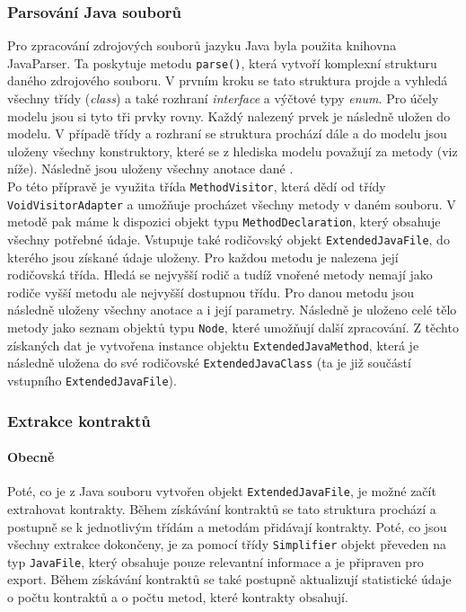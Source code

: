 			\subsubsection{Parsování Java souborů}	    
				Pro zpracování zdrojových souborů jazyku Java byla použita knihovna JavaParser. Ta poskytuje metodu \texttt{parse()}, která vytvoří komplexní strukturu daného zdrojového souboru. V prvním kroku se tato struktura projde a vyhledá všechny třídy (\emph{class}) a také rozhraní \emph{interface} a výčtové typy \emph{enum}. Pro účely modelu jsou si tyto tři prvky rovny. Každý nalezený prvek je následně uložen do modelu. V případě třídy a rozhraní se struktura prochází dále a do modelu jsou uloženy všechny konstruktory, které se z hlediska modelu považují za metody (viz níže). Následně jsou uloženy všechny anotace dané .\\
			
				Po této přípravě je využita třída \texttt{MethodVisitor}, která dědí od třídy \texttt{VoidVisitorAdapter} a umožňuje procházet všechny metody v daném souboru. V metodě pak máme k dispozici objekt typu \texttt{MethodDeclaration}, který obsahuje všechny potřebné údaje. Vstupuje také rodičovský objekt \texttt{ExtendedJavaFile}, do kterého jsou získané údaje uloženy. Pro každou metodu je nalezena její rodičovská třída. Hledá se nejvyšší rodič a tudíž vnořené metody nemají jako rodiče vyšší metodu ale nejvyšší dostupnou třídu. Pro danou metodu jsou následně uloženy všechny anotace a i její parametry. Následně je uloženo celé tělo metody jako seznam objektů typu \texttt{Node}, které umožňují další zpracování. Z těchto získaných dat je vytvořena instance objektu \texttt{ExtendedJavaMethod}, která je následně uložena do své rodičovské \texttt{ExtendedJavaClass} (ta je již součástí vstupního \texttt{ExtendedJavaFile}).
				
			\subsubsection{Extrakce kontraktů}
			
			\paragraph{Obecně}
				Poté, co je z Java souboru vytvořen objekt \texttt{ExtendedJavaFile}, je možné začít extrahovat kontrakty. Během získávání kontraktů se tato struktura prochází a postupně se k jednotlivým třídám a metodám přidávají kontrakty. Poté, co jsou všechny extrakce dokončeny, je za pomocí třídy \texttt{Simplifier} objekt převeden na typ \texttt{JavaFile}, který obsahuje pouze relevantní informace a je připraven pro export.	Během získávání kontraktů se také postupně aktualizují statistické údaje o počtu kontraktů a o počtu metod, které kontrakty obsahují.	
			
